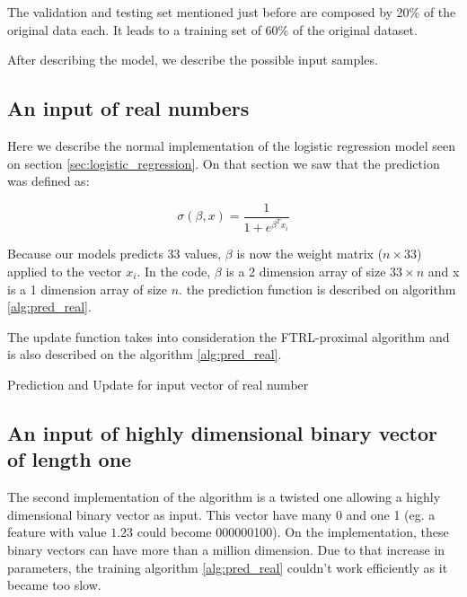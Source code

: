 		The validation and testing set mentioned just before are composed by 20\% of the original data each. It leads to a training set of 60\% of the original dataset.

		After describing the model, we describe the possible input samples.


	\subsection{An input of real numbers}
		Here we describe the normal implementation of the logistic regression model seen on section \ref{sec:logistic_regression}. On that section we saw that the prediction was defined as: 

		$$ \sigma(\beta,x) = \frac{ 1 }{1 + e^{\beta^T x_i} } $$

		Because our models predicts 33 values, $\beta$ is now the weight matrix ($n \times 33$) applied to the vector $x_i$. In the code, $\beta$ is a 2 dimension array of size $33 \times n$ and x is a 1 dimension array of size $n$. the prediction function is described on algorithm \ref{alg:pred_real}.

		The update function takes into consideration the FTRL-proximal algorithm and is also described on the algorithm \ref{alg:pred_real}.


		\begin{algorithm}[H]


			\caption{Prediction and Update for input vector of real number}
			\label{alg:pred_real}
		\end{algorithm}


	\subsection{An input of highly dimensional binary vector of length one}
		The second implementation of the algorithm is a twisted one allowing a highly dimensional binary vector as input. This vector have many 0 and one 1 (eg. a feature with value $1.23$ could become 000000100). On the implementation, these binary vectors can have more than a million dimension. Due to that increase in parameters, the training algorithm \ref{alg:pred_real} couldn't work efficiently as it became too slow.

